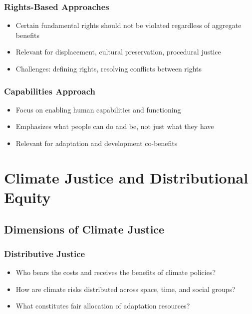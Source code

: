 \documentclass[
  letterpaper,
  DIV=11,
  numbers=noendperiod]{scrreprt}
\providecommand{\tightlist}{%
  \setlength{\itemsep}{0pt}\setlength{\parskip}{0pt}}
\begin{document}
\subsubsection{Rights-Based Approaches}\label{rights-based-approaches}

\begin{itemize}
\tightlist
\item
  Certain fundamental rights should not be violated regardless of
  aggregate benefits
\item
  Relevant for displacement, cultural preservation, procedural justice
\item
  Challenges: defining rights, resolving conflicts between rights
\end{itemize}

\subsubsection{Capabilities Approach}\label{capabilities-approach}

\begin{itemize}
\tightlist
\item
  Focus on enabling human capabilities and functioning
\item
  Emphasizes what people can do and be, not just what they have
\item
  Relevant for adaptation and development co-benefits
\end{itemize}

\section{Climate Justice and Distributional
Equity}\label{climate-justice-and-distributional-equity}

\subsection{Dimensions of Climate
Justice}\label{dimensions-of-climate-justice}

\subsubsection{Distributive Justice}\label{distributive-justice}

\begin{itemize}
\tightlist
\item
  Who bears the costs and receives the benefits of climate policies?
\item
  How are climate risks distributed across space, time, and social
  groups?
\item
  What constitutes fair allocation of adaptation resources?
\end{itemize}
\end{document}
